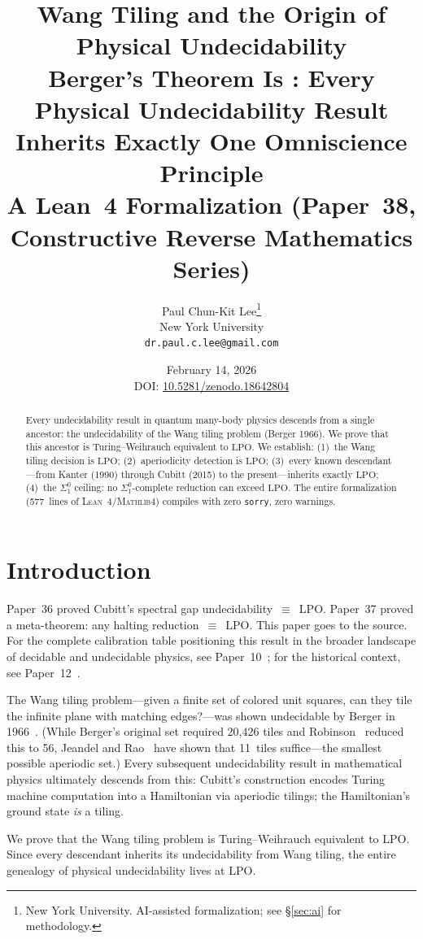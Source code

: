 \documentclass[11pt,a4paper]{article}
\title{%
  \textbf{Wang Tiling and the Origin of Physical Undecidability}\\[6pt]
  {\normalsize Berger's Theorem Is \LPO: Every Physical Undecidability
  Result Inherits Exactly One Omniscience Principle}\\[6pt]
  {\normalsize A Lean~4 Formalization (Paper~38, Constructive Reverse Mathematics Series)}%
}
\author{
  Paul Chun-Kit Lee\thanks{%
    New York University.
    AI-assisted formalization; see \S\ref{sec:ai} for methodology.} \\
  New York University \\
  \texttt{dr.paul.c.lee@gmail.com}
}
\date{February 14, 2026\\[4pt]
  {\small DOI: \href{https://doi.org/10.5281/zenodo.18642804}{10.5281/zenodo.18642804}}}
\theoremstyle{plain}
\theoremstyle{definition}
\newcommand{\LPO}{\ensuremath{\mathrm{LPO}}}
\newcommand{\Lean}{\textsc{Lean~4}}
\newcommand{\Mathlib}{\textsc{Mathlib4}}
\begin{document}
\maketitle

\begin{abstract}
Every undecidability result in quantum many-body physics descends
from a single ancestor: the undecidability of the Wang tiling
problem (Berger 1966).  We prove that this ancestor is
Turing--Weihrauch equivalent to \LPO.
We establish: (1)~the Wang tiling decision is \LPO;
(2)~aperiodicity detection is \LPO;
(3)~every known descendant---from Kanter (1990) through
Cubitt (2015) to the present---inherits exactly \LPO;
(4)~the $\Sigma_1^0$ ceiling: no $\Sigma_1^0$-complete
reduction can exceed \LPO.
The entire formalization (577~lines of \Lean{}/\Mathlib{})
compiles with zero \texttt{sorry}, zero warnings.
\end{abstract}

\section{Introduction}\label{sec:intro}

Paper~36 proved Cubitt's spectral gap undecidability~$\equiv$~\LPO.
Paper~37 proved a meta-theorem: any halting reduction~$\equiv$~\LPO.
This paper goes to the source.  For the complete calibration table
positioning this result in the broader landscape of decidable and
undecidable physics, see Paper~10~\cite{Lee26P10}; for the historical
context, see Paper~12~\cite{Lee26P12}.

The Wang tiling problem---given a finite set of colored unit squares,
can they tile the infinite plane with matching edges?---was shown
undecidable by Berger in 1966~\cite{Berger1966}.  (While Berger's
original set required 20{,}426 tiles and Robinson~\cite{Robinson1971}
reduced this to 56, Jeandel and Rao~\cite{JeandelRao2021} have shown
that 11~tiles suffice---the smallest possible aperiodic set.)
Every subsequent undecidability
result in mathematical physics ultimately descends from this:
Cubitt's construction encodes Turing machine computation into a
Hamiltonian via aperiodic tilings; the Hamiltonian's ground state
\emph{is} a tiling.

We prove that the Wang tiling problem is Turing--Weihrauch equivalent
to \LPO.  Since every descendant inherits its undecidability from
Wang tiling, the entire genealogy of physical undecidability lives
at \LPO.
\end{document}
